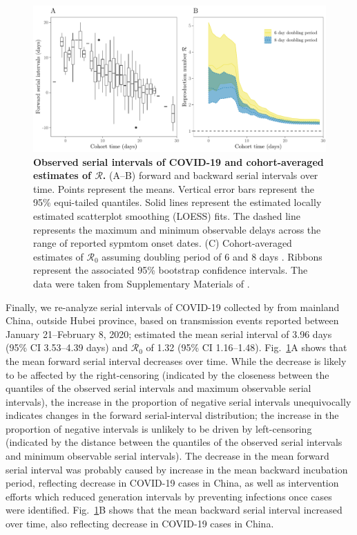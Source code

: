 \documentclass[12pt]{article}
\newcommand{\fref}[1]{Fig.~\ref{fig:#1}}
\newcommand{\Rx}[1]{\ensuremath{{\mathcal R}_{#1}}\xspace}
\newcommand{\Ro}{\Rx{0}}
\newcommand{\RR}{\ensuremath{{\mathcal R}}\xspace}
\begin{document}
\begin{figure}[!th]
\includegraphics[width=\textwidth]{serial_analysis.pdf}
\caption{
\textbf{Observed serial intervals of COVID-19 and cohort-averaged estimates of \RR.}
(A--B) forward and backward serial intervals over time.
Points represent the means. 
Vertical error bars represent the 95\% equi-tailed quantiles.
Solid lines represent the estimated locally estimated scatterplot smoothing (LOESS) fits.
The dashed line represents the maximum and minimum observable delays across the range of reported sypmtom onset dates.
(C) Cohort-averaged estimates of \Ro assuming doubling period of 6 and 8 days \citep{li2020early, wu2020nowcasting}.
Ribbons represent the associated 95\% bootstrap confidence intervals.
The data were taken from Supplementary Materials of \cite{du2020serial}.
}
\label{fig:du}
\end{figure}

Finally, we re-analyze serial intervals of COVID-19 collected by \cite{du2020serial} from mainland China, outside Hubei province, based on transmission events reported between January 21--February 8, 2020;
\cite{du2020serial} estimated the mean serial interval of 3.96 days (95\% CI 3.53–4.39 days) and \Ro of 1.32 (95\% CI 1.16–1.48).
\fref{du}A shows that the mean forward serial interval decreases over time.
While the decrease is likely to be affected by the right-censoring (indicated by the closeness between the quantiles of the observed serial intervals and maximum observable serial intervals), the increase in the proportion of negative serial intervals unequivocally indicates changes in the forward serial-interval distribution;
the increase in the proportion of negative intervals is unlikely to be driven by left-censoring (indicated by the distance between the quantiles of the observed serial intervals and minimum observable serial intervals).
The decrease in the mean forward serial interval was probably caused by increase in the mean backward incubation period, reflecting decrease in COVID-19 cases in China, as well as intervention efforts which reduced generation intervals by preventing infections once cases were identified.
\fref{du}B shows that the mean backward serial interval increased over time, also reflecting decrease in COVID-19 cases in China.
\end{document}
